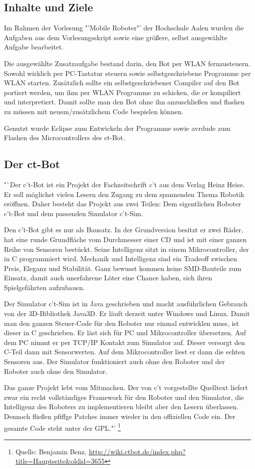 \subsection{Inhalte und Ziele}
Im Rahmen der Vorlesung "'Mobile Roboter"' der Hochschule Aalen wurden die Aufgaben aus dem Vorlesungsskript sowie eine größere, selbst ausgewählte Aufgabe bearbeitet.

Die ausgewählte Zusatzaufgabe bestand darin, den Bot per WLAN fernzusteuern. Sowohl wirklich per PC-Tastatur steuern sowie selbstgeschriebene Programme per WLAN starten. Zusätzlich sollte ein selbstgeschriebener Compiler auf den Bot portiert werden, um ihm per WLAN Programme zu schicken, die er kompiliert und interpretiert. Damit sollte man den Bot ohne ihn anzuschließen und flashen zu müssen mit neuem/zusätzlichem Code bespielen können.

Genutzt wurde Eclipse zum Entwickeln der Programme sowie avrdude zum Flashen des Microcontrollers des ct-Bot.

\subsection{Der ct-Bot}
"`Der c't-Bot ist ein Projekt der Fachzeitschrift c't aus dem Verlag Heinz Heise.
Er soll möglichst vielen Lesern den Zugang zu dem spannenden Thema Robotik eröffnen.
Daher besteht das Projekt aus zwei Teilen: Dem eigentlichen Roboter c't-Bot und dem passenden Simulator c't-Sim.

Den c't-Bot gibt es nur als Bausatz. In der Grundversion besitzt er zwei Räder,
hat eine runde Grundfläche vom Durchmesser einer CD und ist mit einer ganzen Reihe von Sensoren
bestückt. Seine Intelligenz sitzt in einem Mikrocontroller, der in C programmiert wird. Mechanik
und Intelligenz sind ein Tradeoff zwischen Preis, Eleganz und Stabilität. Ganz bewusst kommen keine
SMD-Bauteile zum Einsatz, damit auch unerfahrene Löter eine Chance haben,
sich ihren Spielgefährten aufzubauen.

Der Simulator c't-Sim ist in Java geschrieben und macht ausführlichen Gebrauch von der
3D-Bibliothek Java3D. Er läuft derzeit unter Windows und Linux. Damit man den ganzen Steuer-Code
für den Roboter nur einmal entwicklen muss, ist dieser in C geschrieben. Er läst sich für PC und Mikrocontroller
übersetzen. Auf dem PC nimmt er per TCP/IP Kontakt zum Simulator auf. Dieser versorgt den C-Teil dann mit Sensorwerten.
Auf dem Mikrocontroller liest er dann die echten Sensoren aus. Der Simulator funktioniert auch
ohne den Roboter und der Roboter auch ohne den Simulator.

Das ganze Projekt lebt vom Mitmachen. Der von c't vorgestellte Quelltext liefert zwar ein recht
vollständiges Framework für den Roboter und den Simulator, die Intelligenz des Roboters zu
implementieren bleibt aber den Lesern überlassen. Dennoch fließen pfiffge Patches immer wieder in
den offiziellen Code ein. Der gesamte Code steht unter der GPL."'
\footnote{Quelle: Benjamin Benz, \url{http://wiki.ctbot.de/index.php?title=Hauptseite&oldid=3655}}



